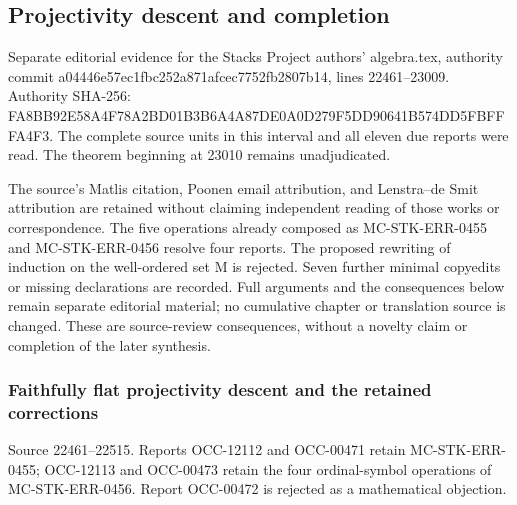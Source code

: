 \subsection{Projectivity descent and completion}\label{algebra-proof-014-projectivity-descent-and-completion}

Separate editorial evidence for the Stacks Project authors' algebra.tex, authority commit a044\allowbreak{}46e5\allowbreak{}7ec1\allowbreak{}fbc2\allowbreak{}52a8\allowbreak{}71af\allowbreak{}cec7\allowbreak{}752f\allowbreak{}b280\allowbreak{}7b14, lines 22461--23009. Authority SHA-256: FA8B\allowbreak{}B92E\allowbreak{}58A4\allowbreak{}F78A\allowbreak{}2BD0\allowbreak{}1B3B\allowbreak{}6A4A\allowbreak{}87DE\allowbreak{}0A0D\allowbreak{}279F\allowbreak{}5DD9\allowbreak{}0641\allowbreak{}B574\allowbreak{}DD5F\allowbreak{}BFFF\allowbreak{}A4F3. The complete source units in this interval and all eleven due reports were read. The theorem beginning at 23010 remains unadjudicated.

The source's Matlis citation, Poonen email attribution, and Lenstra--de Smit attribution are retained without claiming independent reading of those works or correspondence. The five operations already composed as MC-\AlgebraIdentifierBreak{}STK-\AlgebraIdentifierBreak{}ERR-\AlgebraIdentifierBreak{}0455 and MC-\AlgebraIdentifierBreak{}STK-\AlgebraIdentifierBreak{}ERR-\AlgebraIdentifierBreak{}0456 resolve four reports. The proposed rewriting of induction on the well-ordered set M is rejected. Seven further minimal copyedits or missing declarations are recorded. Full arguments and the consequences below remain separate editorial material; no cumulative chapter or translation source is changed. These are source-review consequences, without a novelty claim or completion of the later synthesis.

\subsubsection{Faithfully flat projectivity descent and the retained corrections}\label{algebra-proof-014-faithfully-flat-projectivity-descent-and-the-retained-corrections}

Source 22461--22515. Reports OCC-12112 and OCC-00471 retain MC-\AlgebraIdentifierBreak{}STK-\AlgebraIdentifierBreak{}ERR-\AlgebraIdentifierBreak{}0455; OCC-12113 and OCC-00473 retain the four ordinal-symbol operations of MC-\AlgebraIdentifierBreak{}STK-\AlgebraIdentifierBreak{}ERR-\AlgebraIdentifierBreak{}0456. Report OCC-00472 is rejected as a mathematical objection.

